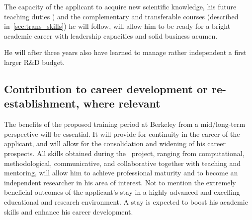The capacity  of the applicant  to acquire new scientific  knowledge, his
future teaching  duties ) and the  complementary and
transferable courses (described in~\ref{sec:trans_skills}) he will follow, 
will allow him to be  ready for a  bright academic career with  leadership capacities
and solid business acumen.
 
He  will  after  three  years  also  have  learned  to  manage  rather
independent a first larger R\&D budget.
 
\subsection{Contribution to career development or re-establishment, where relevant}
The benefits of the proposed training period at Berkeley from a mid/long-term perspective will 
be essential. It will provide for continuity in the career of the applicant, and will allow for the consolidation and 
widening of his career prospects. All skills obtained during the \ksem\ project, ranging 
from computational, methodological, communicative, and collaborative together with 
teaching and mentoring, will allow him to achieve professional maturity and to become an 
independent researcher in his area of interest. Not to mention the extremely beneficial 
outcomes of the applicant's stay in a highly advanced and excelling educational  and 
research environment. A stay is expected to boost his academic skills and enhance his career development.

